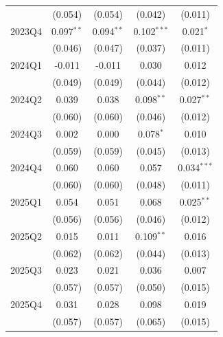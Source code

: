 \begin{table}[htbp]
\begin{tabular}{lcccc}
 & (0.054) & (0.054) & (0.042) & (0.011) \\
2023Q4 & 0.097$^{**}$ & 0.094$^{**}$ & 0.102$^{***}$ & 0.021$^{*}$ \\
 & (0.046) & (0.047) & (0.037) & (0.011) \\
2024Q1 & -0.011 & -0.011 & 0.030 & 0.012 \\
 & (0.049) & (0.049) & (0.044) & (0.012) \\
2024Q2 & 0.039 & 0.038 & 0.098$^{**}$ & 0.027$^{**}$ \\
 & (0.060) & (0.060) & (0.046) & (0.012) \\
2024Q3 & 0.002 & 0.000 & 0.078$^{*}$ & 0.010 \\
 & (0.059) & (0.059) & (0.045) & (0.013) \\
2024Q4 & 0.060 & 0.060 & 0.057 & 0.034$^{***}$ \\
 & (0.060) & (0.060) & (0.048) & (0.011) \\
2025Q1 & 0.054 & 0.051 & 0.068 & 0.025$^{**}$ \\
 & (0.056) & (0.056) & (0.046) & (0.012) \\
2025Q2 & 0.015 & 0.011 & 0.109$^{**}$ & 0.016 \\
 & (0.062) & (0.062) & (0.044) & (0.013) \\
2025Q3 & 0.023 & 0.021 & 0.036 & 0.007 \\
 & (0.057) & (0.057) & (0.050) & (0.015) \\
2025Q4 & 0.031 & 0.028 & 0.098 & 0.019 \\
 & (0.057) & (0.057) & (0.065) & (0.015) \\
\bottomrule
\end{tabular}
\par\vspace{2pt}{\footnotesize Reference quarter 2022Q3 omitted. Standard errors clustered on occupation in parentheses. * p<0.10, ** p<0.05, *** p<0.01.}
\end{table}
